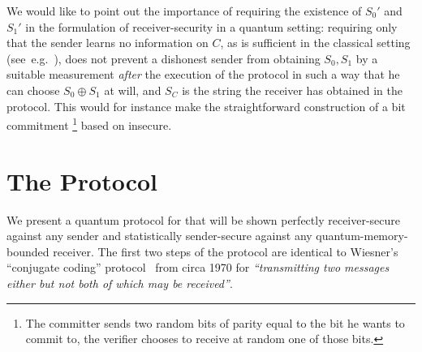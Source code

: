 We would like to point out the importance of requiring the existence
of $S_0'$ and $S_1'$ in the formulation of receiver-security in a
quantum setting: requiring only that the sender learns no information
on $C$, as is sufficient in the classical setting
(see~e.g.~\cite{CSSW06}), does not prevent a dishonest sender from
obtaining $S_0,S_1$ by a suitable measurement {\em after} the
execution of the protocol in such a way that he can choose $S_0 \oplus
S_1$ at will, and $S_C$ is the string the receiver has obtained in the
protocol. This would for instance make the straightforward
construction of a bit commitment
\footnote{The committer sends two random bits of parity
  equal to the bit he wants to commit to, the verifier chooses to
  receive at random one of those bits.} based on
\OT[2] insecure.

\section{The Protocol}\label{sec:otprot12}
We present a quantum protocol for \RandlStringOT that will be shown
perfectly receiver-secure against any sender and statistically
sender-secure against any quantum-memory-bounded receiver. The first
two steps of the protocol are identical to Wiesner's ``conjugate
coding''  protocol~\cite{Wiesner83} from circa 1970 for
\emph{``transmitting two messages either but not both of which may be
  received''}.

